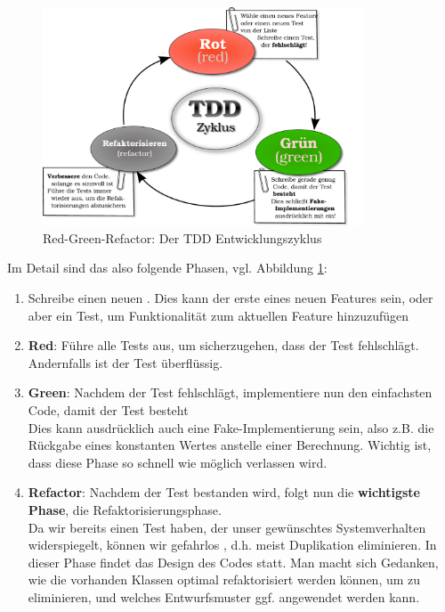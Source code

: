   \begin{figure}[htbp]
 \centering
 \includegraphics[width=0.85\textwidth]{./diagrams/red-green-refactor.pdf}
 \caption{Red-Green-Refactor: Der TDD Entwicklungszyklus}
 
 \label{fig:redgreenrefactor}
\end{figure}
  Im Detail sind das also folgende Phasen, vgl. Abbildung \ref{fig:redgreenrefactor}:
  \begin{enumerate}
   \item Schreibe einen neuen . Dies kann der erste eines neuen Features sein, oder aber ein Test, um Funktionalität zum aktuellen Feature hinzuzufügen
   \item \textbf{Red}: Führe alle Tests aus, um sicherzugehen, dass der Test fehlschlägt. Andernfalls ist der Test überflüssig.
   \item \textbf{Green}: Nachdem der Test fehlschlägt, implementiere nun den einfachsten Code, damit der Test besteht\\
   Dies kann ausdrücklich auch eine Fake-Implementierung sein, also z.B. die Rückgabe eines konstanten Wertes anstelle einer Berechnung. Wichtig ist, dass diese Phase so schnell wie möglich verlassen wird.
   \item \textbf{Refactor}: Nachdem der Test bestanden wird, folgt nun die \textbf{wichtigste Phase}, die Refaktorisierungsphase.\\
   Da wir bereits einen Test haben, der unser gewünschtes Systemverhalten widerspiegelt, können wir gefahrlos , d.h. meist Duplikation eliminieren. In dieser Phase findet das Design des Codes statt. Man macht sich Gedanken, wie die vorhanden Klassen optimal refaktorisiert werden können, um  zu eliminieren, und welches Entwurfsmuster ggf. angewendet werden kann.
  \end{enumerate}
  
